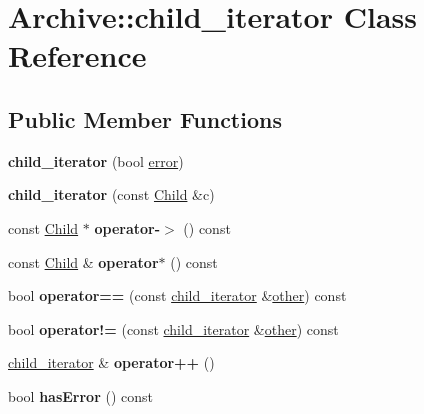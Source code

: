 \hypertarget{class_archive_1_1child__iterator}{}\section{Archive\+:\+:child\+\_\+iterator Class Reference}
\label{class_archive_1_1child__iterator}
\subsection*{Public Member Functions}
\begin{DoxyCompactItemize}
\item 
\mbox{\label{class_archive_1_1child__iterator_a9632c17f5250bf696c26db8f765165c5}} 
{\bfseries child\+\_\+iterator} (bool \mbox{\hyperlink{structerror}{error}})
\item 
\mbox{\label{class_archive_1_1child__iterator_a8ae5c92bc6277867e736c45cf8a2e730}} 
{\bfseries child\+\_\+iterator} (const \mbox{\hyperlink{class_archive_1_1_child}{Child}} \&c)
\item 
\mbox{\label{class_archive_1_1child__iterator_ac169daf32c10d7c71ad33833fefbe88b}} 
const \mbox{\hyperlink{class_archive_1_1_child}{Child}} $\ast$ {\bfseries operator-\/$>$} () const
\item 
\mbox{\label{class_archive_1_1child__iterator_a04a602b2576496b626cc0bb4d727e654}} 
const \mbox{\hyperlink{class_archive_1_1_child}{Child}} \& {\bfseries operator$\ast$} () const
\item 
\mbox{\label{class_archive_1_1child__iterator_a1079c3f15dcf20331addb82cd77d4ba5}} 
bool {\bfseries operator==} (const \mbox{\hyperlink{class_archive_1_1child__iterator}{child\+\_\+iterator}} \&\mbox{\hyperlink{structother}{other}}) const
\item 
\mbox{\label{class_archive_1_1child__iterator_a7e0c59b84d9508a27374b54f9388a5e3}} 
bool {\bfseries operator!=} (const \mbox{\hyperlink{class_archive_1_1child__iterator}{child\+\_\+iterator}} \&\mbox{\hyperlink{structother}{other}}) const
\item 
\mbox{\label{class_archive_1_1child__iterator_a4684f330f54630bc0f5f7f3b505a3497}} 
\mbox{\hyperlink{class_archive_1_1child__iterator}{child\+\_\+iterator}} \& {\bfseries operator++} ()
\item 
\mbox{\label{class_archive_1_1child__iterator_a16b4c450ec422b258adbb1427aebffc4}} 
bool {\bfseries has\+Error} () const
\end{DoxyCompactItemize}
